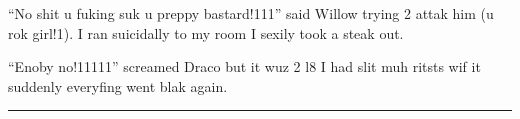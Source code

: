 \enquote{No shit u fuking suk u preppy bastard!111} said Willow trying 2 attak him (u rok girl!1). I ran suicidally to my room I sexily took a steak out.

\enquote{Enoby no!11111} screamed Draco but it wuz 2 l8 I had slit muh ritsts wif it suddenly everyfing went blak again.

\par\nobreak\vspace{1em}\noindent
\rule{1in}{0.4pt}

\begin{sloppypar}
    \noindent{}
\end{sloppypar}